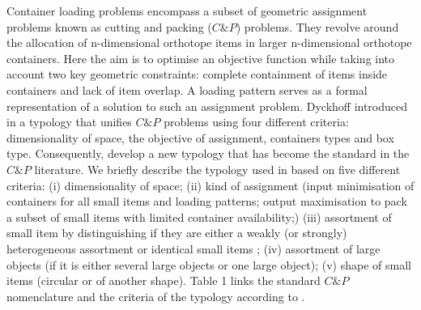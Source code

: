 Container loading problems encompass a subset of geometric assignment problems known as cutting and packing ($C\&P$) problems. They revolve around the allocation of n-dimensional orthotope items in larger n-dimensional orthotope containers. Here the aim is to optimise an objective function while taking into account two key geometric constraints: complete containment of items inside containers and lack of item overlap. A loading pattern serves as a formal representation of a solution to such an assignment problem.
Dyckhoff introduced in \autocite{Dyckhoff1990AProblems} a typology that unifies $C\&P$ problems using four different criteria: dimensionality of space, the objective of assignment, containers types and box type. Consequently, \autocite{Wascher2007AnProblems} develop a new typology that has become the standard in the $C\&P$ literature. We   briefly  describe  the  typology  used  in  \autocite{Wascher2007AnProblems}  based  on  five different criteria: (i) dimensionality of space; (ii) kind of assignment (input minimisation of containers for all small items and loading patterns; output maximisation to pack a subset of small items with limited container availability;) (iii) assortment of small item by distinguishing if they are either a weakly (or strongly) heterogeneous assortment or identical small items ; (iv) assortment of large objects (if it is either several large objects or one large object); (v) shape of small items (circular or of another shape). Table 1 links the standard $C\&P$ nomenclature and the criteria of the typology according to \autocite{Wascher2007AnProblems}.



